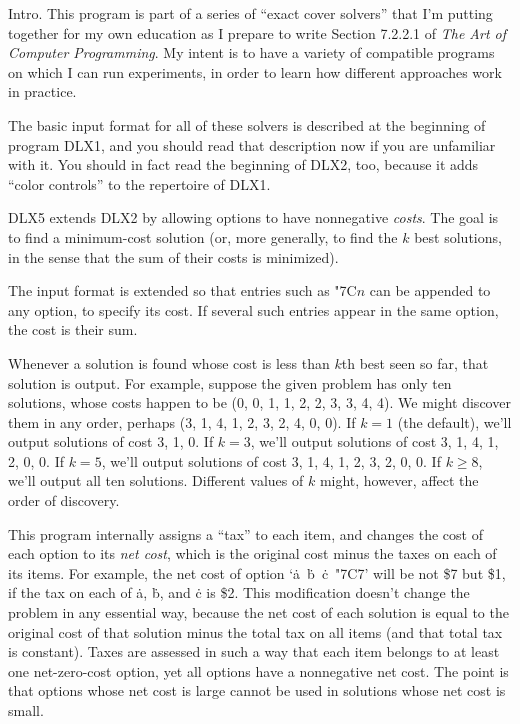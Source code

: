 
\let\Xmod=\bmod %

\datethis

Intro. This program is part of a series of ``exact cover solvers'' that
I'm putting together for my own education as I prepare to write Section
7.2.2.1 of {\sl The Art of Computer Programming}. My intent is to
have a variety of compatible programs on which I can run experiments,
in order to learn how different approaches work in practice.

The basic input format for all of these solvers is described at the beginning
of program {\mc DLX1}, and you should read that description now if you are
unfamiliar with it. You should in fact read the beginning of {\mc DLX2}, too,
because it adds ``color controls'' to the repertoire of {\mc DLX1}.

{\mc DLX5} extends {\mc DLX2} by allowing options to have nonnegative
{\it costs}. The goal is to find a minimum-cost solution (or, more generally,
to find the $k$ best solutions, in the sense that the sum of their
costs is minimized).

The input format is extended so that entries such as \.{{\char"7C}$n$}
can be appended to any option, to specify its cost. If several such
entries appear in the same option, the cost is their sum.

Whenever a solution is found whose cost is less than $k$th best seen so far,
that solution is output. For example, suppose the given problem has
only ten solutions, whose costs happen to be (0, 0, 1, 1, 2, 2, 3, 3, 4, 4).
We might discover them in any order, perhaps (3, 1, 4, 1, 2, 3, 2, 4, 0, 0).
If $k=1$ (the default), we'll output solutions of cost 3, 1, 0.
If $k=3$, we'll output solutions of cost 3, 1, 4, 1, 2, 0, 0.
If $k=5$, we'll output solutions of cost 3, 1, 4, 1, 2, 3, 2, 0, 0.
If $k\ge8$, we'll output all ten solutions.
Different values of $k$ might, however, affect the order of discovery.

This program internally assigns a ``tax'' to each item, and changes the cost
of each option to its {\it net cost}, which is the original cost minus
the taxes on each of its items. For example, the net cost of
option `\.a~\.b~\.c~\.{{\char"7C}7}' will be not \$7 but \$1, if
the tax on each of \.a, \.b, and \.c is \$2. This modification doesn't
change the problem in any essential way, because the net cost of each
solution is equal to the original cost of that solution minus the
total tax on all items (and that total tax is constant). Taxes are assessed
in such a way that each item belongs to at least one net-zero-cost option,
yet all options have a nonnegative net cost. The point is that options
whose net cost is large cannot be used in solutions whose net cost is small.

